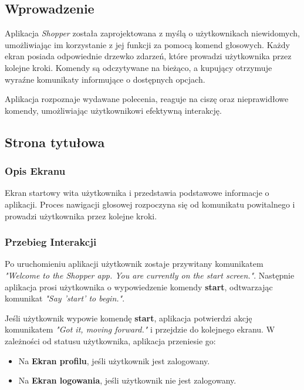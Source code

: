 \subsection{Wprowadzenie}

Aplikacja \textit{Shopper} została zaprojektowana z myślą o użytkownikach niewidomych, umożliwiając im  korzystanie z jej funkcji za pomocą komend głosowych. Każdy ekran posiada odpowiednie drzewko zdarzeń, które prowadzi użytkownika przez kolejne kroki. Komendy są odczytywane na bieżąco, a kupujący otrzymuje wyraźne komunikaty informujące o dostępnych opcjach.

Aplikacja rozpoznaje wydawane polecenia, reaguje na ciszę oraz nieprawidłowe komendy, umożliwiając użytkownikowi efektywną interakcję.

\subsection{Strona tytułowa}

\subsubsection{Opis Ekranu}
Ekran startowy wita użytkownika i przedstawia podstawowe informacje o aplikacji. Proces nawigacji głosowej rozpoczyna się od komunikatu powitalnego i prowadzi użytkownika przez kolejne kroki.

\subsubsection{Przebieg Interakcji}
Po uruchomieniu aplikacji użytkownik zostaje przywitany komunikatem \textit{"Welcome to the Shopper app. You are currently on the start screen."}. Następnie aplikacja prosi użytkownika o wypowiedzenie komendy \textbf{start}, odtwarzając komunikat \textit{"Say 'start' to begin."}.

Jeśli użytkownik wypowie komendę \textbf{start}, aplikacja potwierdzi akcję komunikatem \textit{"Got it, moving forward."} i przejdzie do kolejnego ekranu. W zależności od statusu użytkownika, aplikacja przeniesie go:

\begin{itemize}
    \item Na \textbf{Ekran profilu}, jeśli użytkownik jest zalogowany.
    \item Na \textbf{Ekran logowania}, jeśli użytkownik nie jest zalogowany.
\end{itemize}

